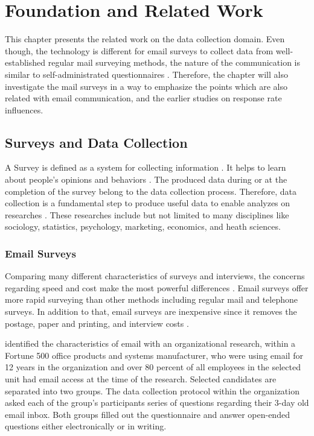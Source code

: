 \chapter{Foundation and Related Work}
\label{chp:FouRelWor}
This chapter presents the related work on the data collection domain. Even though, the technology is different for email surveys to collect data from well-established regular mail surveying methods, the nature of the communication is similar to self-administrated questionnaires \citep{Schaefer1998}. Therefore, the chapter will also investigate the mail surveys in a way to emphasize the points which are also related with email communication, and the earlier studies on response rate influences.

\section{Surveys and Data Collection}
\label{sec:1:SurDatCol}
A Survey is defined as a system for collecting information \citep[page 3]{Sue2011}. It helps to learn about people's opinions and behaviors \citep{DillmanDonA.SmythJoleneD.Christian2009}. The produced data during or at the completion of the survey belong to the data collection process. Therefore, data collection is a fundamental step to produce useful data to enable analyzes on researches \citep[page 149]{Groves2009}. These researches include but not limited to many disciplines like sociology, statistics, psychology, marketing, economics, and heath sciences. 

\subsection{Email Surveys}
\label{sec:2.1.1:EmaSur}

Comparing many different characteristics of surveys and interviews, the concerns regarding speed and cost make the most powerful differences \citep{Sproull1986, Schaefer1998}. Email surveys offer more rapid surveying than other methods including regular mail and telephone surveys. In addition to that, email surveys are inexpensive since it removes the postage, paper and printing, and interview costs \citep{Schaefer1998}.
\vspace{1cm}

\cite{Sproull1986} identified the characteristics of email with an organizational research, within a Fortune 500 office products and systems manufacturer, who were using email for 12 years in the organization and over 80 percent of all employees in the selected unit had email access at the time of the research. Selected candidates are separated into two groups. The data collection protocol within the organization asked each of the group's participants series of questions regarding their 3-day old email inbox. Both groups filled out the questionnaire and answer open-ended questions either electronically or in writing.
\vspace{1cm}

